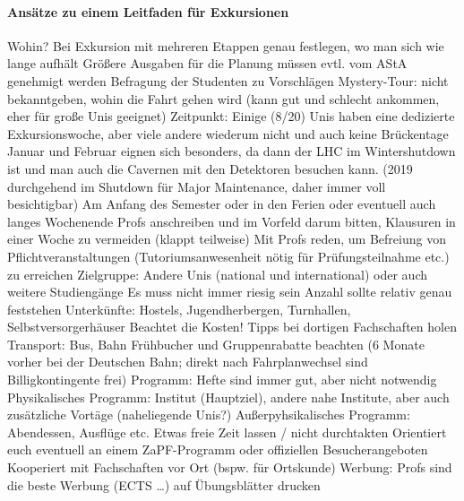     \paragraph{Ansätze zu einem Leitfaden für Exkursionen}
      \begin{outline}
        \1 Wohin?
          \2 Bei Exkursion mit mehreren Etappen genau festlegen, wo man sich wie lange aufhält
          \2 Größere Ausgaben für die Planung müssen evtl. vom AStA genehmigt werden
          \2 Befragung der Studenten zu Vorschlägen
          \2 Mystery-Tour: nicht bekanntgeben, wohin die Fahrt gehen wird (kann gut und schlecht ankommen, eher für große Unis geeignet)
        \1 Zeitpunkt:
          \2 Einige (8/20) Unis haben eine dedizierte Exkursionswoche, aber viele andere wiederum nicht und auch keine Brückentage
          \2 Januar und Februar eignen sich besonders, da dann der LHC im Wintershutdown ist und man auch die Cavernen mit den Detektoren besuchen kann. (2019 durchgehend im Shutdown für Major Maintenance, daher immer voll besichtigbar)
          \2 Am Anfang des Semester oder in den Ferien oder eventuell auch langes Wochenende
          \2 Profs anschreiben und im Vorfeld darum bitten, Klausuren in einer Woche zu vermeiden (klappt teilweise)
          \2 Mit Profs reden, um Befreiung von Pflichtveranstaltungen (Tutoriumsanwesenheit nötig für Prüfungsteilnahme etc.) zu erreichen
        \1 Zielgruppe:
          \2 Andere Unis (national und international) oder auch weitere Studiengänge
          \2 Es muss nicht immer riesig sein
          \2 Anzahl sollte relativ genau feststehen
        \1 Unterkünfte:
          \2 Hostels, Jugendherbergen, Turnhallen, Selbstversorgerhäuser
          \2 Beachtet die Kosten!
          \2 Tipps bei dortigen Fachschaften holen
        \1 Transport:
          \2 Bus, Bahn
          \2 Frühbucher und Gruppenrabatte beachten (6 Monate vorher bei der Deutschen Bahn; direkt nach Fahrplanwechsel sind Billigkontingente frei)
        \1 Programm:
          \2 Hefte sind immer gut, aber nicht notwendig
          \2 Physikalisches Programm: Institut (Hauptziel), andere nahe Institute, aber auch zusätzliche Vortäge (naheliegende Unis?)
          \2 Außerpyhsikalisches Programm: Abendessen, Ausflüge etc.
          \2 Etwas freie Zeit lassen / nicht durchtakten
          \2 Orientiert euch eventuell an einem ZaPF-Programm oder offiziellen Besucherangeboten
          \2 Kooperiert mit Fachschaften vor Ort (bspw. für Ortskunde)
        \1 Werbung:
          \2 Profs sind die beste Werbung (ECTS \dots)
          \2 auf Übungsblätter drucken

\end{outline}
